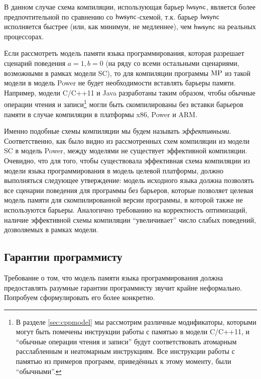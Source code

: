 В данном случае схема компиляции, использующая барьер $\mathsf{lwsync}$, является более предпочтительной по сравнению
со $\mathsf{hwsync}$-схемой, т.к. барьер $\mathsf{lwsync}$ исполняется быстрее (или, как минимум, не медленнее), чем $\mathsf{hwsync}$
на реальных процессорах.

Если рассмотреть модель памяти языка программирования, которая разрешает сценарий поведения $a=1,b=0$
(на ряду со всеми остальными сценариями, возможными в рамках модели SC), то для компиляции программы
${\rm MP}$ из такой модели в модель Power не будет необходимости вставлять барьеры памяти.
Например, модели C/C++11 \cite{Batty-al:POPL11} и Java \cite{Manson-al:POPL05} разработаны таким образом, чтобы
обычные операции чтения и записи\footnote{В разделе \ref{sec:cppmodel} мы рассмотрим различные модификаторы, которыми могут
быть помечены инструкции работы с памятью в модели C/C++11, и ``обычные операции чтения и записи'' будут соответствовать
атомарным расслабленным и неатомарным инструкциям.
Все инструкции работы с памятью из примеров программ, приведённых к этому моменту, были ``обычными''.}
могли быть скомпилированы без вставки барьеров памяти в случае компиляции в платформы x86, Power и ARM.

Именно подобные схемы компиляции мы будем называть \emph{эффективными}.
Соответственно, как было видно из рассмотренных схем компиляции из модели SC в модель Power, между моделями
не существует эффективной компиляции.
Очевидно, что для того, чтобы существовала эффективная схема компиляции из модели языка программирования в модель
целевой платформы, должно выполняться следующее утверждение:
модель исходного языка должна позволять все сценарии поведения для программы без барьеров,
которые позволяет целевая модель памяти для скомпилированной версии программы, в которой также не используются барьеры.
Аналогично требованию на корректность оптимизаций, наличие эффективной схемы компиляции ``увеличивает'' число
слабых поведений, дозволяемых в рамках модели.



\subsection{Гарантии программисту} %
Требование о том, что модель памяти языка программирования должна предоставлять разумные
гарантии программисту звучит крайне неформально.
Попробуем сформулировать его более конкретно.

